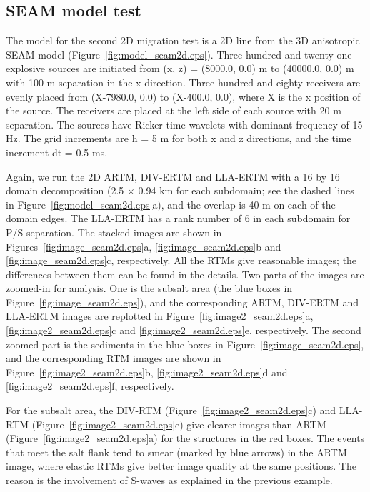 \documentclass[manuscript,ulem,graphix,revised]{geophysics}
\begin{document}
\subsection{SEAM model test}
\indent\indent
The model for the second 2D migration test is a 2D line from the 3D anisotropic SEAM model \citep{fehler11} (Figure~\ref{fig:model_seam2d.eps}). Three hundred and twenty one explosive sources are initiated from (x, z) = (8000.0, 0.0) m to  (40000.0, 0.0) m with 100 m separation in the x direction. Three hundred and eighty receivers are evenly placed from (X-7980.0, 0.0) to (X-400.0, 0.0), where X is the x position of the source. The receivers are placed at the left side of each source with 20 m separation. The sources have Ricker time wavelets with dominant frequency of 15 Hz. The grid increments are h = 5 m for both x and z directions, and the time increment dt = 0.5 ms.

Again, we run the 2D ARTM, DIV-ERTM and LLA-ERTM with a 16 by 16 domain decomposition (2.5 $\times$ 0.94 km for each subdomain; see the dashed lines in Figure~\ref{fig:model_seam2d.eps}a), and the overlap is 40 m on each of the domain edges. The LLA-ERTM has a rank number of 6 in each subdomain for P/S separation. The stacked images are shown in Figures~\ref{fig:image_seam2d.eps}a, \ref{fig:image_seam2d.eps}b and \ref{fig:image_seam2d.eps}c, respectively. All the RTMs give reasonable images; the differences between them can be found in the details.
Two parts of the images are zoomed-in for analysis. One is the subsalt area (the blue boxes in Figure~\ref{fig:image_seam2d.eps}), and the corresponding ARTM, DIV-ERTM and LLA-ERTM images are replotted in Figure~\ref{fig:image2_seam2d.eps}a, \ref{fig:image2_seam2d.eps}c and \ref{fig:image2_seam2d.eps}e, respectively. 
The second zoomed part is the sediments in the blue boxes in Figure~\ref{fig:image_seam2d.eps}, and the corresponding RTM images are shown in Figure~\ref{fig:image2_seam2d.eps}b, \ref{fig:image2_seam2d.eps}d and \ref{fig:image2_seam2d.eps}f, respectively.

For the subsalt area, the DIV-RTM (Figure~\ref{fig:image2_seam2d.eps}c) and LLA-RTM (Figure~\ref{fig:image2_seam2d.eps}e) give clearer images than ARTM (Figure~\ref{fig:image2_seam2d.eps}a) for the structures in the red boxes. 
The events that meet the salt flank tend to smear (marked by blue arrows) in the ARTM image, where elastic RTMs give better image quality at the same positions.
The reason is the involvement of S-waves as explained in the previous example. 
\end{document}
